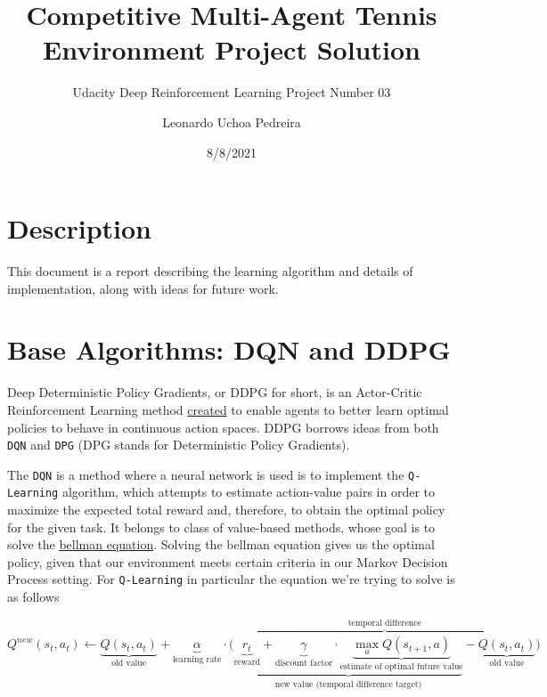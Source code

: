 \documentclass[
]{article}
\title{Competitive Multi-Agent Tennis Environment Project Solution}
\subtitle{Udacity Deep Reinforcement Learning Project Number 03}
\author{Leonardo Uchoa Pedreira}
\date{8/8/2021}
\begin{document}
\maketitle

{
\setcounter{tocdepth}{2}
\tableofcontents
}
\hypertarget{description}{%
\section{Description}\label{description}}

This document is a report describing the learning algorithm and details
of implementation, along with ideas for future work.

\pagebreak

\hypertarget{base-algorithms-dqn-and-ddpg}{%
\section{Base Algorithms: DQN and
DDPG}\label{base-algorithms-dqn-and-ddpg}}

Deep Deterministic Policy Gradients, or DDPG for short, is an
Actor-Critic Reinforcement Learning method
\href{https://arxiv.org/pdf/1509.02971.pdf}{created} to enable agents to
better learn optimal policies to behave in continuous action spaces.
DDPG borrows ideas from both \texttt{DQN} and \texttt{DPG} (DPG stands
for Deterministic Policy Gradients).

The \texttt{DQN} is a method where a neural network is used is to
implement the \texttt{Q-Learning} algorithm, which attempts to estimate
action-value pairs in order to maximize the expected total reward and,
therefore, to obtain the optimal policy for the given task. It belongs
to class of value-based methods, whose goal is to solve the
\href{https://en.wikipedia.org/wiki/Bellman_equation}{bellman equation}.
Solving the bellman equation gives us the optimal policy, given that our
environment meets certain criteria in our Markov Decision Process
setting. For \texttt{Q-Learning} in particular the equation we're trying
to solve is as follows

\[
\displaystyle Q^{new}(s_{t},a_{t})\leftarrow \underbrace {Q(s_{t},a_{t})} _{\text{old value}}+\underbrace {\alpha } _{\text{learning rate}}\cdot \overbrace {{\bigg (}\underbrace {\underbrace {r_{t}} _{\text{reward}}+\underbrace {\gamma } _{\text{discount factor}}\cdot \underbrace {\max _{a}Q(s_{t+1},a)} _{\text{estimate of optimal future value}}} _{\text{new value (temporal difference target)}}-\underbrace {Q(s_{t},a_{t})} _{\text{old value}}{\bigg )}} ^{\text{temporal difference}} 
\]
\end{document}
